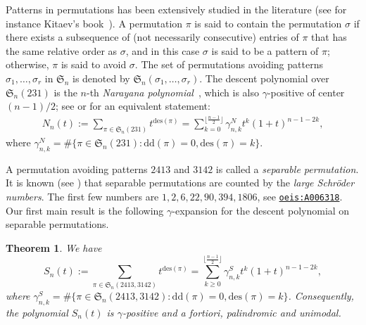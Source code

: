 \documentclass[12pt]{amsart}
\numberwithin{equation}{section}
\theoremstyle{plain}
\newtheorem{theorem}{Theorem}[section]
\theoremstyle{definition}
\def\dd{\mathrm{dd}}
\def\des{\mathrm{des}}
\def\S{\mathfrak{S}}
\begin{document}

Patterns in permutations has been extensively studied in the literature (see for instance
Kitaev's book~\cite{ki}). 
A permutation $\pi$ is said to contain the permutation $\sigma$  if there exists a subsequence of (not necessarily consecutive) entries of $\pi$ that has the same relative order as $\sigma$, and in this case $\sigma$ is said to be a pattern of $\pi$; otherwise, 
$\pi$ is said to avoid  $\sigma$.  The set of permutations avoiding patterns
$\sigma_1, \ldots, \sigma_r$ in $\S_n$ is denoted by $\S_n(\sigma_1, \ldots, \sigma_r)$.
The descent polynomial over $\S_n(231)$ is the $n$-th 
 {\em Narayana polynomial}~\cite[Chapter 2]{Pet},  which 
 is also $\gamma$-positive of center $(n-1)/2$; see \cite[Theorem 4.2]{Pet} or \cite[Proposition 11.14]{prw} for an equivalent statement:
\begin{align}\label{Nara}
N_n(t):=\sum_{\pi\in \S_n(231)} t^{\des(\pi)}=\sum_{k=0}^{\lfloor\frac{n-1}{2}\rfloor}\gamma_{n,k}^N t^k(1+t)^{n-1-2k},
\end{align}
 where  $\gamma_{n,k}^N=\#\{\pi\in \S_n(231): \dd(\pi)=0,  \des(\pi)=k\}$. 
 
A  permutation avoiding patterns $2413$ and $3142$ is called a 
 \emph{separable permutation}. 
It is known (see \cite{sh,we}) that separable permutations are counted by the \emph{large Schr\"oder numbers}.  The first few numbers are $1,2,6,22,90,394,1806$, see \href{http://oeis.org/A006318}{\tt{oeis:A006318}}. Our first main result is the following $\gamma$-expansion for the descent polynomial on separable permutations.

\begin{theorem}\label{gamma:s} We have 
\begin{equation}\label{gam:scho}
S_n(t):=\sum_{\pi\in\S_n(2413,3142)}t^{\des(\pi)} =\sum_{k\geq 0}^{\lfloor\frac{n-1}{2}\rfloor}\gamma_{n,k}^S t^k (1+t)^{n-1-2k},
\end{equation}
where 
$\gamma_{n,k}^S=\#\{\pi \in \S_n(2413, 3142): \dd(\pi)=0, \des(\pi)=k\}$.
Consequently, the polynomial $S_n(t)$ is $\gamma$-positive and a fortiori, palindromic and unimodal.
\end{theorem}
\end{document}
